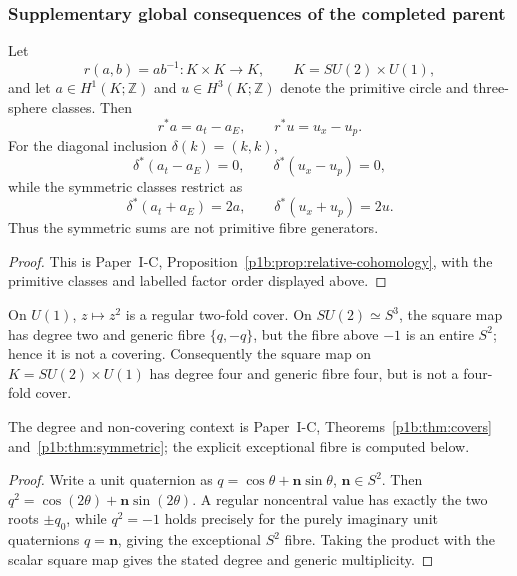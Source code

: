 \documentclass[11pt,a4paper]{article}
\begin{document}
\subsubsection{Supplementary global consequences of the completed parent}
\label{p3b:app:v193-m8-global-consequences}

\begin{proposition}
\label{p3b:prop:v193-relative-cohomology-pullback}
Let
\[
 r(a,b)=ab^{-1}:K\times K\longrightarrow K,
 \qquad K=SU(2)\times U(1),
\]
and let \(a\in H^1(K;\mathbb Z)\) and \(u\in H^3(K;\mathbb Z)\) denote the
primitive circle and three-sphere classes.  Then
\[
 \boxed{r^*a=a_t-a_E,\qquad r^*u=u_x-u_p.}
\]
For the diagonal inclusion \(\delta(k)=(k,k)\),
\[
 \delta^*(a_t-a_E)=0,\qquad \delta^*(u_x-u_p)=0,
\]
while the symmetric classes restrict as
\[
 \boxed{\delta^*(a_t+a_E)=2a,\qquad
        \delta^*(u_x+u_p)=2u.}
\]
Thus the symmetric sums are not primitive fibre generators.
\end{proposition}

\begin{proof}
This is Paper~I-C, Proposition~\ref{p1b:prop:relative-cohomology}, with
the primitive classes and labelled factor order displayed above.
\end{proof}

\begin{proposition}
\label{p3b:prop:v193-square-map-stratification}
On \(U(1)\), \(z\mapsto z^2\) is a regular two-fold cover.  On
\(SU(2)\simeq S^3\), the square map has degree two and generic fibre
\(\{q,-q\}\), but the fibre above \(-1\) is an entire \(S^2\); hence it is
not a covering.  Consequently the square map on
\(K=SU(2)\times U(1)\) has degree four and generic fibre four, but is not a
four-fold cover.
\end{proposition}

The degree and non-covering context is Paper~I-C,
Theorems~\ref{p1b:thm:covers} and~\ref{p1b:thm:symmetric}; the explicit
exceptional fibre is computed below.

\begin{proof}
Write a unit quaternion as
\(q=\cos\theta+\mathbf n\sin\theta\), \(\mathbf n\in S^2\).  Then
\(q^2=\cos(2\theta)+\mathbf n\sin(2\theta)\).  A regular noncentral value has
exactly the two roots \(\pm q_0\), while
\(q^2=-1\) holds precisely for the purely imaginary unit quaternions
\(q=\mathbf n\), giving the exceptional \(S^2\) fibre.  Taking the product
with the scalar square map gives the stated degree and generic multiplicity.
\end{proof}
\end{document}
